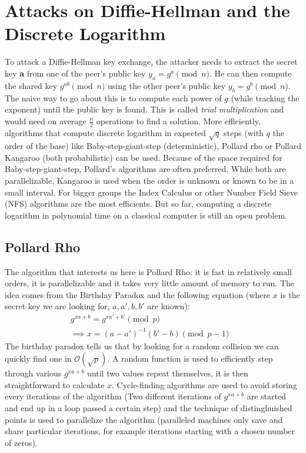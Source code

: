 \documentclass[a4paper,11pt,twocolumn]{article}
\begin{document}
\section{Attacks on Diffie-Hellman and the Discrete Logarithm}

To attack a Diffie-Hellman key exchange, the attacker needs to extract the secret key \textbf{a} from one of the peer's public key $y_a = g^a \pmod{n}$. He can then compute the shared key $g^{ab} \pmod{n}$ using the other peer's public key $y_b = g^b \pmod{n}$.\\

The naive way to go about this is to compute each power of $g$ (while tracking the exponent) until the public key is found. This is called \emph{trial multiplication} and would need on average $\frac{n}{2}$ operations to find a solution.
More efficiently, algorithms that compute discrete logarithm in expected $\sqrt{q}$ steps (with $q$ the order of the base) like Baby-step-giant-step (deterministic), Pollard rho or Pollard Kangaroo (both probabilistic) can be used. Because of the space required for Baby-step-giant-step, Pollard's algorithms are often preferred. While both are parallelizable, Kangaroo is used when the order is unknown or known to be in a small interval. For bigger groups the Index Calculus or other Number Field Sieve (NFS) algorithms are the most efficients. But so far, computing a discrete logarithm in polynomial time on a classical computer is still an open problem.\\

\subsection{Pollard Rho}

The algorithm that interests us here is Pollard Rho: it is fast in relatively small orders, it is parallelizable and it takes very little amount of memory to run. The idea comes from the Birthday Paradox and the following equation (where $x$ is the secret key we are looking for, $a, a', b, b'$ are known):
\begin{align*}
  g^{xa +b } = g^{xa' + b'} \pmod{p}&\\
  \implies x = (a-a')^{-1} (b' - b) \pmod{p-1}&
\end{align*}
The birthday paradox tells us that by looking for a random collision we can quickly find one in $\mathcal{O}(\sqrt{p})$. A random function is used to efficiently step through various $g^{xa + b}$ until two values repeat themselves, it is then straightforward to calculate $x$. Cycle-finding algorithms are used to avoid storing every iterations of the algorithm (Two different iterations of $g^{xa+b}$ are started and end up in a loop passed a certain step) and the technique of distinghuished points is used to parallelize the algorithm (paralleled machines only save and share particular iterations, for example iterations starting with a chosen number of zeros).
\end{document}
